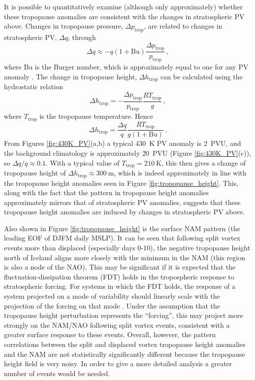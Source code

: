 It is possible to quantitatively examine (although only approximately) whether
these tropopause anomalies are consistent with the changes in stratospheric PV
above. Changes in tropopause pressure, $\Delta p_{\mathrm{trop}}$, are related
to changes in stratospheric PV, $\Delta q$, through
\begin{equation}
\Delta q \approx -q(1+\mathrm{Bu})\frac{\Delta
  p_{\mathrm{trop}}}{p_{\mathrm{trop}}} \, , 
\label{eqn:pv_trop}
\end{equation}
where $\mathrm{Bu}$ is the Burger number, which is approximately equal to one
for any PV anomaly \citep{Ambaum2002}. The change in tropopause height,
$\Delta h_{\mathrm{trop}}$ can be calculated using the hydrostatic relation
\begin{equation}
\Delta h_{\mathrm{trop}} = -\frac{\Delta p_{\mathrm{trop}}}{p_{\mathrm{trop}}}
\frac{R T_{\mathrm{trop}}}{g} \, , 
\end{equation} 
where $T_{\mathrm{trop}}$ is the tropopause temperature. Hence
\begin{equation}
\Delta h_{\mathrm{trop}} = \frac{\Delta q}{q}
\frac{RT_{\mathrm{trop}}}{g(1+\mathrm{Bu})} \, .
\end{equation}
From Figures \ref{fig:430K_PV}(a,b) a typical 430~K PV anomaly is 2~PVU, and the
background climatology is approximately 20~PVU (Figure \ref{fig:430K_PV}(c)), so
$\Delta q/q \approx 0.1$. With a typical value of
$T_{\mathrm{trop}} = 210~\mathrm{K}$, this then gives a change of tropopause
height of $\Delta h_{\mathrm{trop}} \approx 300~\mathrm{m}$, which is indeed
approximately in line with the tropopause height anomalies seen in Figure
\ref{fig:tropopause_height}. This, along with the fact that the pattern in
tropopause height anomalies approximately mirrors that of stratospheric PV
anomalies, suggests that these tropopause height anomalies are induced by
changes in stratospheric PV above.

Also shown in Figure \ref{fig:tropopause_height} is the surface NAM pattern (the
leading EOF of DJFM daily MSLP). It can be seen that following split vortex
events more than displaced (especially days 0-10), the negative tropopause
height north of Iceland aligns more closely with the minimum in the NAM (this
region is also a node of the NAO). This may be significant if it is expected
that the fluctuation-dissipation theorem (FDT) holds in the tropospheric
response to stratospheric forcing. For systems in which the FDT holds, the
response of a system projected on a mode of variability should linearly scale
with the projection of the forcing on that mode \citep{Ring2008}. Under the
assumption that the tropopause height perturbation represents the ``forcing'',
this may project more strongly on the NAM/NAO following split vortex events,
consistent with a greater surface response to these events. Overall, however,
the pattern correlations between the split and displaced vortex tropopause
height anomalies and the NAM are not statistically significantly different
because the tropopause height field is very noisy. In order to give a more
detailed analysis a greater number of events would be needed.


